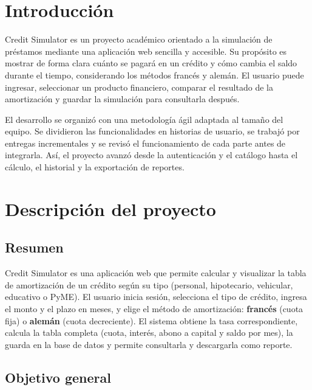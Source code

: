 \documentclass[12pt,a4paper]{article}
\begin{document}
\newpage

\section{Introducción}

Credit Simulator es un proyecto académico orientado a la simulación de préstamos
mediante una aplicación web sencilla y accesible. Su propósito es mostrar de
forma clara cuánto se pagará en un crédito y cómo cambia el saldo durante el
tiempo, considerando los métodos francés y alemán. El usuario puede ingresar,
seleccionar un producto financiero, comparar el resultado de la amortización y
guardar la simulación para consultarla después.

El desarrollo se organizó con una metodología ágil adaptada al tamaño del
equipo. Se dividieron las funcionalidades en historias de usuario, se trabajó
por entregas incrementales y se revisó el funcionamiento de cada parte antes
de integrarla. Así, el proyecto avanzó desde la autenticación y el catálogo
hasta el cálculo, el historial y la exportación de reportes.

\section{Descripción del proyecto}

\subsection{Resumen}

Credit Simulator es una aplicación web que permite calcular y visualizar la tabla de amortización de un crédito según su tipo (personal, hipotecario, vehicular, educativo o PyME). El usuario inicia sesión, selecciona el tipo de crédito, ingresa el monto y el plazo en meses, y elige el método de amortización: \textbf{francés} (cuota fija) o \textbf{alemán} (cuota decreciente). El sistema obtiene la tasa correspondiente, calcula la tabla completa (cuota, interés, abono a capital y saldo por mes), la guarda en la base de datos y permite consultarla y descargarla como reporte.

\subsection{Objetivo general}
\end{document}
